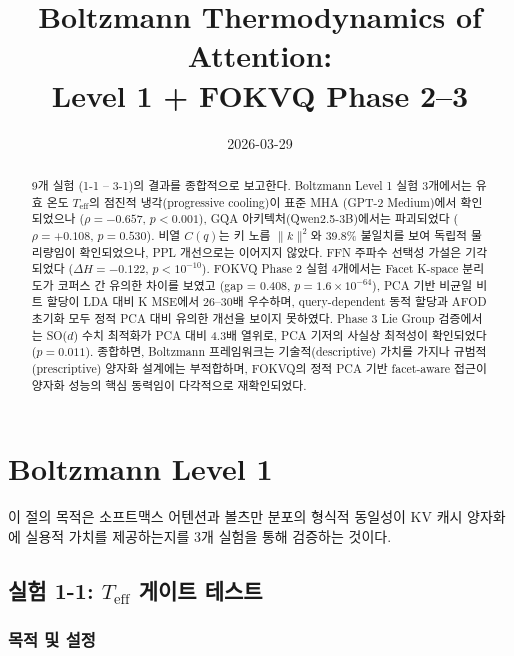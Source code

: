 \documentclass[11pt,a4paper]{article}
\title{Boltzmann Thermodynamics of Attention:\\Level 1 + FOKVQ Phase 2--3\\[0.5em]\large{}}
\author{2026-03-29}
\date{}
\begin{document}
\maketitle

\begin{abstract}
9개 실험 (1-1 -- 3-1)의 결과를 종합적으로 보고한다.
Boltzmann Level 1 실험 3개에서는 유효 온도 $T_\mathrm{eff}$의 점진적 냉각(progressive cooling)이 표준 MHA (GPT-2 Medium)에서 확인되었으나 ($\rho = -0.657$, $p < 0.001$), GQA 아키텍처(Qwen2.5-3B)에서는 파괴되었다 ($\rho = +0.108$, $p = 0.530$).
비열 $C(q)$는 키 노름 $\|k\|^2$와 39.8\% 불일치를 보여 독립적 물리량임이 확인되었으나, PPL 개선으로는 이어지지 않았다.
FFN 주파수 선택성 가설은 기각되었다 ($\Delta H = -0.122$, $p < 10^{-10}$).
FOKVQ Phase 2 실험 4개에서는 Facet K-space 분리도가 코퍼스 간 유의한 차이를 보였고 (gap = 0.408, $p = 1.6 \times 10^{-64}$), PCA 기반 비균일 비트 할당이 LDA 대비 K MSE에서 26--30배 우수하며, query-dependent 동적 할당과 AFOD 초기화 모두 정적 PCA 대비 유의한 개선을 보이지 못하였다.
Phase 3 Lie Group 검증에서는 SO($d$) 수치 최적화가 PCA 대비 4.3배 열위로, PCA 기저의 사실상 최적성이 확인되었다 ($p = 0.011$).
종합하면, Boltzmann 프레임워크는 기술적(descriptive) 가치를 가지나 규범적(prescriptive) 양자화 설계에는 부적합하며, FOKVQ의 정적 PCA 기반 facet-aware 접근이 양자화 성능의 핵심 동력임이 다각적으로 재확인되었다.
\end{abstract}

\tableofcontents
\newpage

\section{Boltzmann Level 1}

이 절의 목적은 소프트맥스 어텐션과 볼츠만 분포의 형식적 동일성이 KV 캐시 양자화에 실용적 가치를 제공하는지를 3개 실험을 통해 검증하는 것이다.

\subsection{실험 1-1: $T_\mathrm{eff}$ 게이트 테스트}

\subsubsection{목적 및 설정}
\end{document}
